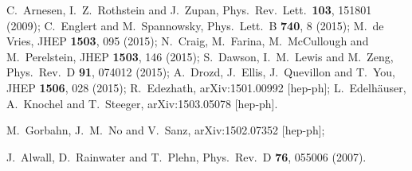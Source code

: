   C.~Arnesen, I.~Z.~Rothstein and J.~Zupan,
  Phys.\ Rev.\ Lett.\  {\bf 103}, 151801 (2009);
  C.~Englert and M.~Spannowsky,
  Phys.\ Lett.\ B {\bf 740}, 8 (2015);
  M.~de Vries,
  JHEP {\bf 1503}, 095 (2015);
  N.~Craig, M.~Farina, M.~McCullough and M.~Perelstein,
  JHEP {\bf 1503}, 146 (2015);
  S.~Dawson, I.~M.~Lewis and M.~Zeng,
  Phys.\ Rev.\ D {\bf 91}, 074012 (2015);
  A.~Drozd, J.~Ellis, J.~Quevillon and T.~You,
  JHEP {\bf 1506}, 028 (2015);
  R.~Edezhath,
  arXiv:1501.00992 [hep-ph];
  L.~Edelh\"auser, A.~Knochel and T.~Steeger,
  arXiv:1503.05078 [hep-ph].

  M.~Gorbahn, J.~M.~No and V.~Sanz,
  arXiv:1502.07352 [hep-ph];

  J.~Alwall, D.~Rainwater and T.~Plehn,
  Phys.\ Rev.\ D {\bf 76}, 055006 (2007).

